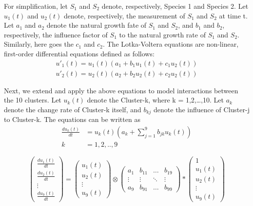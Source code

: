 \documentclass[12pt]{article}
\begin{document}
For simplification, let $S_{1}$ and $S_{2}$ denote, respectively, Species 1 and Species 2. Let $u_{1}(t)$ and $u_{2}(t)$ denote, respectively, the measurement of $S_{1}$ and $S_{2}$ at time t. Let $a_{1}$ and $a_{2}$ denote the natural growth fate of $S_{1}$ and $S_{2}$, and $b_{1}$ and $b_{2}$, respectively, the influence factor of $S_{1}$ to the natural growth rate of $S_{1}$ and $S_{2}$. Similarly, here goes the $c_{1}$ and $c_{2}$. The Lotka-Voltera equations are non-linear, first-order differential equations defined as follows:
\begin{gather}
	u'_{1}(t) = u_{1}(t)(a_{1} + b_{1}u_{1}(t) + c_{1}u_{2}(t)) \label{equ41}\\
	u'_{2}(t) = u_{2}(t)(a_{2} + b_{2}u_{2}(t) + c_{2}u_{2}(t))
\end{gather}

Next, we extend and apply the above equations to model interactions between the 10 clusters. Let $u_{k}(t)$ denote the Cluster-k, where k = 1,2,…,10. Let $a_{k}$ denote the change rate of Cluster-k itself, and $b_{kj}$ denote the influence of Cluster-j to Cluster-k. The equations can be written as
\begin{equation}
	\begin{split}
	\frac{du_{k}(t)}{dt} &= u_{k}(t)(a_{k} + \sum_{j=1}^{9}b_{jk}u_{k}(t)) \\
	k &= 1,2,..,9
	\end{split}
\end{equation}

\begin{equation}
	\begin{pmatrix}
		\frac{du_{1}(t)}{dt} \\
		\frac{du_{2}(t)}{dt} \\
		\vdots \\
		\frac{du_{9}(t)}{dt}	
	\end{pmatrix}
	=
	\begin{pmatrix}
		u_{1}(t) \\
		u_{2}(t) \\
		\vdots \\
		u_{9}(t)
	\end{pmatrix}
	\otimes
	\begin{pmatrix}
		a_{1} & b_{11} & \ldots & b_{19}\\
		\vdots & \vdots & \ddots & \vdots\\
		a_{9} & b_{91} & \ldots & b_{99}
	\end{pmatrix}
	\ast
	\begin{pmatrix}
		1 \\
		u_{1}(t) \\
		u_{2}(t) \\
		\vdots \\
		u_{9}(t)
	\end{pmatrix}
\end{equation}
\end{document}
